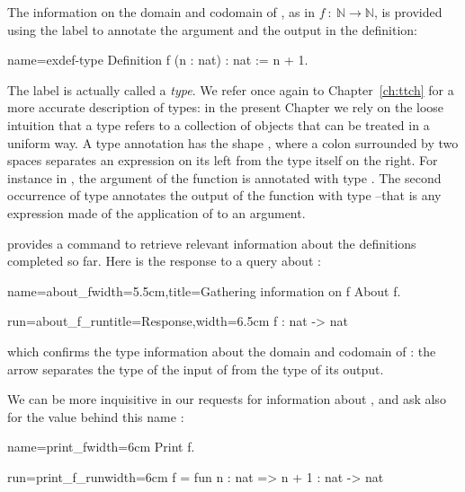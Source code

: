 The information on the domain and codomain of ,
as in \(f\ :\ {\mathbb{N}}\rightarrow{\mathbb{N}}\), is provided using
the  label to annotate the argument and the output in the
\Coq{} definition:

\begin{coq}{name=exdef-type}{}
Definition f (n : nat) : nat := n + 1.
\end{coq}
The label  is actually called a {\em type}.
We refer once again to Chapter~\ref{ch:ttch} for a more accurate
description of types: in the present Chapter we rely on the loose intuition
that a type refers to a collection of objects that can be treated in a
uniform way. A type annotation has the shape , where a colon
\C{:} surrounded by two spaces separates an expression  on its
left from the type  itself on the right. For instance in
, the argument  of the function  is annotated with
type . The second occurrence  of type
 annotates the output of the function with type  --that is any
expression made of the application of  to an argument.

\Coq{} provides a command to retrieve relevant information about the
definitions completed so far. Here is the response to a query about :

\begin{coq}{name=about_f}{width=5.5cm,title=Gathering information on f}
About f.
\end{coq}
\begin{coqout}{run=about_f_run}{title=Response,width=6.5cm}
f : nat -> nat
\end{coqout}
which confirms the type information about the domain and codomain of
: the arrow \C{->} separates the type of the input of  from
the type of its output.

We can be more inquisitive in our requests for information about
, and ask also for the value behind this name :

\begin{coq}{name=print_f}{width=6cm}
Print f.
$~$
\end{coq}
\begin{coqout}{run=print_f_run}{width=6cm}
f = fun n : nat => n + 1
  : nat -> nat
\end{coqout}

